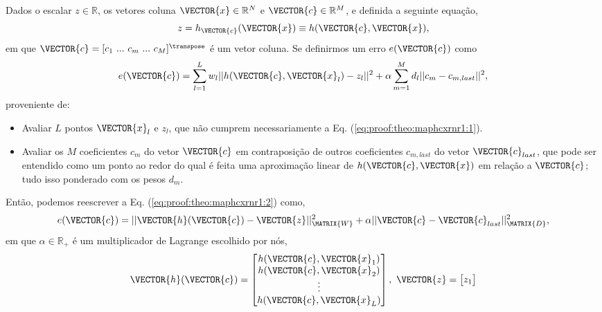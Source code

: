 \begin{myproofT}\label{proof:theo:maphcxrnr1}
Dados
o escalar $z \in \mathbb{R}$, os vetores coluna $\VECTOR{x} \in \mathbb{R}^N$ e $\VECTOR{c} \in \mathbb{R}^M$, e 
definida a seguinte equação,
\begin{equation}\label{eq:proof:theo:maphcxrnr1:1}
z=h_{\VECTOR{c}}(\VECTOR{x})\equiv h(\VECTOR{c},\VECTOR{x}),
\end{equation}
em que $\VECTOR{c}=[c_1~ ...~ c_m~ ...~ c_M]^{\transpose}$ é um vetor coluna.
Se definirmos um erro $e(\VECTOR{c})$ como
\begin{equation}\label{eq:proof:theo:maphcxrnr1:2}
e(\VECTOR{c}) =  \sum_{l=1}^{L} w_l||h(\VECTOR{c},\VECTOR{x}_l)-z_l||^2 + \alpha \sum_{m=1}^{M} d_l||c_m-c_{m,last}||^2,
\end{equation}
proveniente de:
\begin{itemize}
\item Avaliar $L$ pontos $\VECTOR{x}_l$ e $z_l$, que não cumprem necessariamente a Eq. (\ref{eq:proof:theo:maphcxrnr1:1}). 
\item Avaliar os $M$ coeficientes $c_m$ do vetor $\VECTOR{c}$ 
em contraposição de outros coeficientes $c_{m,last}$ do vetor $\VECTOR{c}_{last}$, 
que pode ser entendido como um ponto ao redor do qual é feita uma aproximação
linear de $h(\VECTOR{c},\VECTOR{x})$ em relação a $\VECTOR{c}$; 
tudo isso ponderado com os pesos $d_m$.
\end{itemize}
Então, podemos reescrever a Eq. (\ref{eq:proof:theo:maphcxrnr1:2}) como,
\begin{equation}\label{eq:proof:theo:maphcxrnr1:3}
e(\VECTOR{c}) =  ||\VECTOR{h}(\VECTOR{c})-\VECTOR{z}||_{\MATRIX{W}}^2 + \alpha||\VECTOR{c}-\VECTOR{c}_{last}||_{\MATRIX{D}}^2,
\end{equation}
em que $\alpha \in \mathbb{R}_+$ é um multiplicador de Lagrange escolhido por nós,
\begin{equation}
\VECTOR{h}(\VECTOR{c})=\begin{bmatrix}
h(\VECTOR{c},\VECTOR{x}_1)\\ 
h(\VECTOR{c},\VECTOR{x}_2)\\ 
\vdots\\ 
h(\VECTOR{c},\VECTOR{x}_L)
\end{bmatrix},
~
\VECTOR{z}=\begin{bmatrix}
z_1\\ 

\end{bmatrix}
\end{equation}
\end{myproofT}
